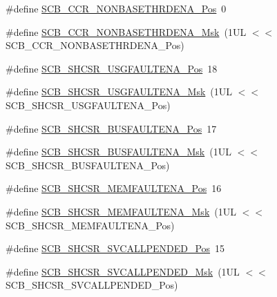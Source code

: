 \begin{DoxyCompactItemize}
\item 
\#define \hyperlink{group___c_m_s_i_s___s_c_b_gab4615f7deb07386350365b10240a3c83}{S\+C\+B\+\_\+\+C\+C\+R\+\_\+\+N\+O\+N\+B\+A\+S\+E\+T\+H\+R\+D\+E\+N\+A\+\_\+\+Pos}~0
\item 
\#define \hyperlink{group___c_m_s_i_s___s_c_b_gafe0f6be81b35d72d0736a0a1e3b4fbb3}{S\+C\+B\+\_\+\+C\+C\+R\+\_\+\+N\+O\+N\+B\+A\+S\+E\+T\+H\+R\+D\+E\+N\+A\+\_\+\+Msk}~(1\+U\+L $<$$<$ S\+C\+B\+\_\+\+C\+C\+R\+\_\+\+N\+O\+N\+B\+A\+S\+E\+T\+H\+R\+D\+E\+N\+A\+\_\+\+Pos)
\item 
\#define \hyperlink{group___c_m_s_i_s___s_c_b_gae71949507636fda388ec11d5c2d30b52}{S\+C\+B\+\_\+\+S\+H\+C\+S\+R\+\_\+\+U\+S\+G\+F\+A\+U\+L\+T\+E\+N\+A\+\_\+\+Pos}~18
\item 
\#define \hyperlink{group___c_m_s_i_s___s_c_b_ga056fb6be590857bbc029bed48b21dd79}{S\+C\+B\+\_\+\+S\+H\+C\+S\+R\+\_\+\+U\+S\+G\+F\+A\+U\+L\+T\+E\+N\+A\+\_\+\+Msk}~(1\+U\+L $<$$<$ S\+C\+B\+\_\+\+S\+H\+C\+S\+R\+\_\+\+U\+S\+G\+F\+A\+U\+L\+T\+E\+N\+A\+\_\+\+Pos)
\item 
\#define \hyperlink{group___c_m_s_i_s___s_c_b_ga3d32edbe4a5c0335f808cfc19ec7e844}{S\+C\+B\+\_\+\+S\+H\+C\+S\+R\+\_\+\+B\+U\+S\+F\+A\+U\+L\+T\+E\+N\+A\+\_\+\+Pos}~17
\item 
\#define \hyperlink{group___c_m_s_i_s___s_c_b_ga43e8cbe619c9980e0d1aacc85d9b9e47}{S\+C\+B\+\_\+\+S\+H\+C\+S\+R\+\_\+\+B\+U\+S\+F\+A\+U\+L\+T\+E\+N\+A\+\_\+\+Msk}~(1\+U\+L $<$$<$ S\+C\+B\+\_\+\+S\+H\+C\+S\+R\+\_\+\+B\+U\+S\+F\+A\+U\+L\+T\+E\+N\+A\+\_\+\+Pos)
\item 
\#define \hyperlink{group___c_m_s_i_s___s_c_b_ga685b4564a8760b4506f14ec4307b7251}{S\+C\+B\+\_\+\+S\+H\+C\+S\+R\+\_\+\+M\+E\+M\+F\+A\+U\+L\+T\+E\+N\+A\+\_\+\+Pos}~16
\item 
\#define \hyperlink{group___c_m_s_i_s___s_c_b_gaf084424fa1f69bea36a1c44899d83d17}{S\+C\+B\+\_\+\+S\+H\+C\+S\+R\+\_\+\+M\+E\+M\+F\+A\+U\+L\+T\+E\+N\+A\+\_\+\+Msk}~(1\+U\+L $<$$<$ S\+C\+B\+\_\+\+S\+H\+C\+S\+R\+\_\+\+M\+E\+M\+F\+A\+U\+L\+T\+E\+N\+A\+\_\+\+Pos)
\item 
\#define \hyperlink{group___c_m_s_i_s___s_c_b_ga2f93ec9b243f94cdd3e94b8f0bf43641}{S\+C\+B\+\_\+\+S\+H\+C\+S\+R\+\_\+\+S\+V\+C\+A\+L\+L\+P\+E\+N\+D\+E\+D\+\_\+\+Pos}~15
\item 
\#define \hyperlink{group___c_m_s_i_s___s_c_b_ga6095a7acfbad66f52822b1392be88652}{S\+C\+B\+\_\+\+S\+H\+C\+S\+R\+\_\+\+S\+V\+C\+A\+L\+L\+P\+E\+N\+D\+E\+D\+\_\+\+Msk}~(1\+U\+L $<$$<$ S\+C\+B\+\_\+\+S\+H\+C\+S\+R\+\_\+\+S\+V\+C\+A\+L\+L\+P\+E\+N\+D\+E\+D\+\_\+\+Pos)
$$
\end{DoxyCompactItemize}
